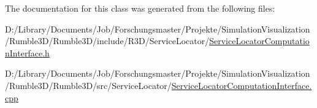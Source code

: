 The documentation for this class was generated from the following files\+:\begin{DoxyCompactItemize}
\item 
D\+:/\+Library/\+Documents/\+Job/\+Forschungsmaster/\+Projekte/\+Simulation\+Visualization/\+Rumble3\+D/\+Rumble3\+D/include/\+R3\+D/\+Service\+Locator/\mbox{\hyperlink{_service_locator_computation_interface_8h}{Service\+Locator\+Computation\+Interface.\+h}}\item 
D\+:/\+Library/\+Documents/\+Job/\+Forschungsmaster/\+Projekte/\+Simulation\+Visualization/\+Rumble3\+D/\+Rumble3\+D/src/\+Service\+Locator/\mbox{\hyperlink{_service_locator_computation_interface_8cpp}{Service\+Locator\+Computation\+Interface.\+cpp}}\end{DoxyCompactItemize}
